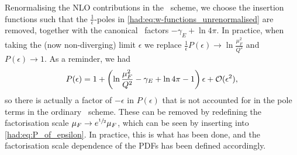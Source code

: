 \documentclass[../main.tex]{subfiles}
\begin{document}
Renormalising the NLO contributions in the \MSbar\ scheme, we choose the insertion functions such that the \(\frac{1}{\epsilon}\)-poles in \cref{had:eq:w-functions_unrenormalised} are removed, together with the canonical \MSbar\ factors \(-\gamma_E + \ln 4\pi\).
In practice, when taking the (now non-diverging) limit \(\epsilon\) we replace \(\frac{1}{\epsilon} P(\epsilon) \to \ln\frac{\mu_F^2}{Q^2}\) and \(P(\epsilon) \to 1\).
As a reminder, we had
\begin{equation}
  \label{had:eq:P_of_epsilon}
  P(\epsilon) = 1 + \left(\ln\frac{\mu_F^2}{Q^2} - \gamma_E + \ln 4\pi - 1\right)\epsilon + \mathcal{O}(\epsilon^2),
\end{equation}
so there is actually a factor of \(-\epsilon\) in \(P(\epsilon)\) that is not accounted for in the pole terms in the ordinary \MSbar\ scheme.
These can be removed by redefining the factorisation scale \(\mu_F \to e^{\sfrac{1}{2}} \mu_F\), which can be seen by inserting into \cref{had:eq:P_of_epsilon}.
In practice, this is what has been done, and the factorisation scale dependence of the PDFs has been defined accordingly.
\end{document}
